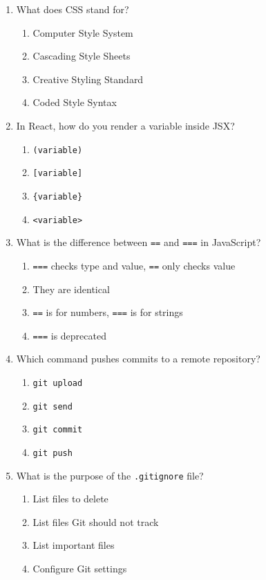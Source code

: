 \documentclass[12pt,a4paper]{article}
\begin{document}
\begin{enumerate}
\item What does CSS stand for?
\begin{enumerate}[label=\Alph*)]
    \item Computer Style System
    \item Cascading Style Sheets
    \item Creative Styling Standard
    \item Coded Style Syntax
\end{enumerate}

\item In React, how do you render a variable inside JSX?
\begin{enumerate}[label=\Alph*)]
    \item \texttt{(variable)}
    \item \texttt{[variable]}
    \item \texttt{\{variable\}}
    \item \texttt{<variable>}
\end{enumerate}

\item What is the difference between \texttt{==} and \texttt{===} in JavaScript?
\begin{enumerate}[label=\Alph*)]
    \item \texttt{===} checks type and value, \texttt{==} only checks value
    \item They are identical
    \item \texttt{==} is for numbers, \texttt{===} is for strings
    \item \texttt{===} is deprecated
\end{enumerate}

\item Which command pushes commits to a remote repository?
\begin{enumerate}[label=\Alph*)]
    \item \texttt{git upload}
    \item \texttt{git send}
    \item \texttt{git commit}
    \item \texttt{git push}
\end{enumerate}

\item What is the purpose of the \texttt{.gitignore} file?
\begin{enumerate}[label=\Alph*)]
    \item List files to delete
    \item List files Git should not track
    \item List important files
    \item Configure Git settings
\end{enumerate}


\end{enumerate}
\end{document}
